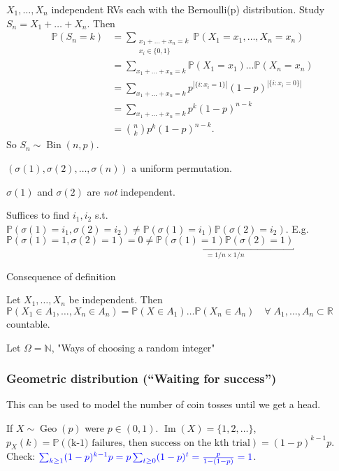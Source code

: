 \begin{example}
    $X_1, \dots, X_n$ independent RVs each with the Bernoulli(p) distribution.
    Study $S_n = X_1 + \dots + X_n$.
    Then 
    \begin{align*}
        \mathbb{P}(S_n = k) &= \sum_{\substack{x_1 + \dots + x_n = k \\ x_i \in \{0, 1\} }}\mathbb{P}(X_1 = x_1, \dots, X_n = x_n) \\
        &= \sum_{x_1 + \dots + x_n = k} \mathbb{P}(X_1 = x_1) \dots \mathbb{P}(X_n = x_n) \\
        &= \sum_{x_1 + \dots + x_n = k} p^{|\{i : x_i = 1\}|} (1 - p)^{|\{i : x_i = 0\}|} \\
        &= \sum_{x_1 + \dots + x_n = k} p^k (1-p)^{n - k} \\
        &= \binom{n}{k} p^k (1-p)^{n - k}.
    \end{align*} 
    So $S_n \sim \operatorname{Bin}(n, p)$.
\end{example} 

\begin{example}
    $(\sigma(1), \sigma(2), \dots, \sigma(n))$ a uniform permutation.
    \begin{claim}
        $\sigma(1)$ and $\sigma(2)$ are \emph{not} independent.
    \end{claim} 
    Suffices to find $i_1, i_2$ s.t. $\mathbb{P}(\sigma(1) = i_1, \sigma(2) = i_2) \neq \mathbb{P}(\sigma(1) = i_1) \mathbb{P}(\sigma(2) = i_2)$.
    E.g. $\mathbb{P}(\sigma(1) = 1, \sigma(2) = 1) = 0 \neq \underbracket{\mathbb{P}(\sigma(1) = 1) \mathbb{P}(\sigma(2) = 1)}_{= 1 / n \times 1 /n}$
\end{example} 

Consequence of definition

Let $X_1, \dots, X_n$ be independent.
Then $\mathbb{P}(X_1 \in A_1, \dots, X_n \in A_n) = \mathbb{P}(X \in A_1) \dots \mathbb{P}(X_n \in A_n) \quad \forall \; A_1, \dots, A_n \subset \mathbb{R}$ countable.

Let $\Omega = \mathbb{N}$, "Ways of choosing a random integer"

\subsubsection{Geometric distribution (``Waiting for success'')}
This can be used to model the number of coin tosses until we get a head.

If $X \sim \operatorname{Geo}(p)$ were $p \in (0, 1)$.
$\operatorname{Im}(X) = \{1, 2, \dots\}$, \\
$p_X(k) = \mathbb{P}(\text{(k-1) failures, then success on the kth trial}) = (1-p)^{k-1}p$.
\color{blue} Check: $\mathcolor{blue}{\sum_{k \geq 1} (1-p)^{k - 1} p = p \sum_{t \geq 0} (1-p)^t = \frac{p}{1 - (1 - p)} = 1}$.\color{black}

